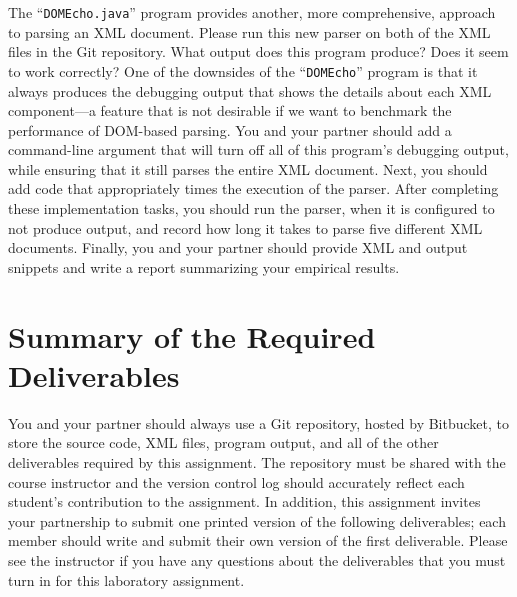 The ``{\tt DOMEcho.java}'' program provides another, more comprehensive, approach to parsing an XML document. Please run
this new parser on both of the XML files in the Git repository. What output does this program produce? Does it seem to
work correctly? One of the downsides of the ``{\tt DOMEcho}'' program is that it always produces the debugging output
that shows the details about each XML component---a feature that is not desirable if we want to benchmark the
performance of DOM-based parsing. You and your partner should add a command-line argument that will turn off all of this
program's debugging output, while ensuring that it still parses the entire XML document. Next, you should add code
that appropriately times the execution of the parser. After completing these implementation tasks, you should run the
parser, when it is configured to not produce output, and record how long it takes to parse five different XML documents.
Finally, you and your partner should provide XML and output snippets and write a report summarizing your empirical
results.

\section*{Summary of the Required Deliverables}

You and your partner should always use a Git repository, hosted by Bitbucket, to store the source code, XML files,
program output, and all of the other deliverables required by this assignment. The repository must be shared with the
course instructor and the version control log should accurately reflect each student's contribution to the assignment.
In addition, this assignment invites your partnership to submit one printed version of the following deliverables; each
member should write and submit their own version of the first deliverable. Please see the instructor if you have
any questions about the deliverables that you must turn in for this laboratory assignment.

